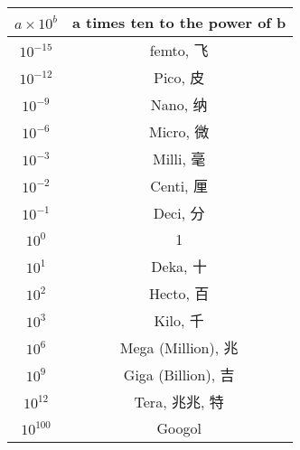 \begin{center}

\begin{tabular}{|c|c|}

\hline

$a \times 10^b$ & a times ten to the power of b \\

\hline

$10^{-15}$ & femto, 飞 \\

$10^{-12}$ & Pico, 皮 \\

$10^{-9}$ & Nano, 纳 \\

$10^{-6}$ & Micro, 微 \\

$10^{-3}$ & Milli, 毫 \\

$10^{-2}$ & Centi, 厘 \\

$10^{-1}$ & Deci, 分 \\

$10^0$ & 1 \\

$10^1$ & Deka, 十 \\

$10^2$ & Hecto, 百 \\

$10^3$ & Kilo, 千 \\

$10^6$ & Mega (Million), 兆  \\

$10^9$ & Giga (Billion), 吉  \\

$10^{12}$ & Tera, 兆兆, 特 \\

$10^{100}$ & Googol \\

\hline
\end{tabular}



\end{center}